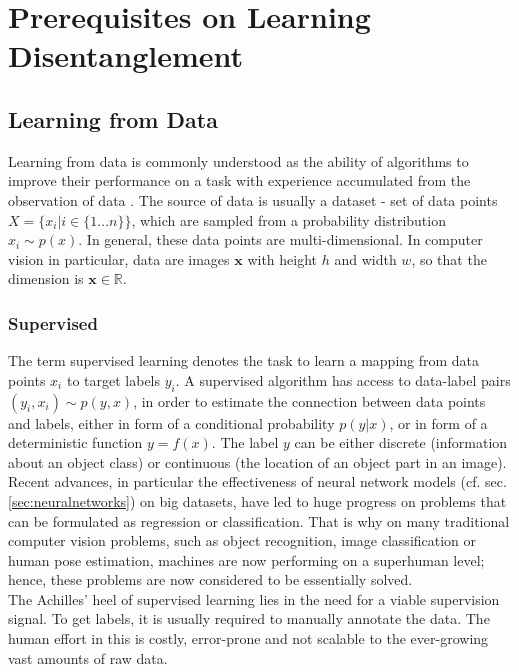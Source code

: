 \chapter{Prerequisites on Learning Disentanglement}\label{sec:prerequisites}

\section{Learning from Data}
	{Learning from data} is commonly understood as the ability of algorithms to improve their performance on a task with experience accumulated from the observation of data \cite{goodfellow16dlb}. The source of data is usually a dataset - set of data points $X = \{x_i | i \in \{1\ldots n\} \}$, which are sampled from a probability distribution $x_i \sim p(x)$.
	In general, these data points are multi-dimensional. In computer vision in particular, data are images $\mathbf{x}$ with height $h$ and width $w$, so that the dimension is $\mathbf{x} \in \mathbb{R}$.

	\subsection{Supervised}\label{sec:supervised}
		The term {supervised learning} denotes the task to learn a mapping from data points $x_i$ to target labels $y_i$.
		A supervised algorithm has access to data-label pairs  $(y_i, x_i) \sim p(y, x)$, in order to estimate the connection between data points and labels, either in form of a conditional probability $p(y|x)$, or in form of a deterministic function $y = f(x)$.
		The label $y$ can be either discrete (\eg information about an object class) or continuous (\eg the location of an object part in an image).
		Recent advances, in particular the effectiveness of neural network models (cf. sec. \ref{sec:neuralnetworks}) on big datasets, have led to huge progress on problems that can be formulated as regression or classification. That is why on many traditional computer vision problems, such as \eg object recognition, image classification or human pose estimation, machines are now performing on a superhuman level; hence, these problems are now considered to be essentially solved.\\
		The Achilles' heel of supervised learning lies in the need for a viable supervision signal. To get labels, it is usually required to manually annotate the data. The human effort in this is costly, error-prone and not scalable to the ever-growing vast amounts of raw data.


